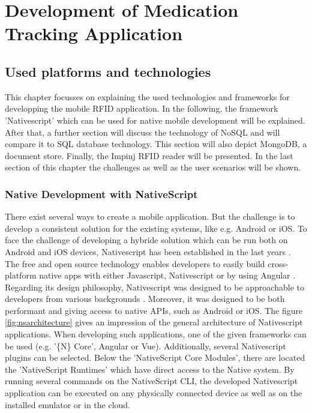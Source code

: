 \chapter{Development of Medication Tracking Application}
\label{Kap3}

\section{Used platforms and technologies} \label{platforms}

This chapter focusses on explaining the used technologies and frameworks for developping the mobile RFID application. In the following, the framework 'Nativescript' which can be used for native mobile development will be explained. After that, a further section will discuss the technology of NoSQL and will compare it to SQL database technology. This section will also depict MongoDB, a document store. Finally, the Impinj RFID reader will be presented. In the last section \pageref{app_development} of this chapter the challenges as well as the user scenarios will be shown. 

\subsection{Native Development with NativeScript} 

There exist several ways to create a mobile application. But the challenge is to develop a consistent solution for the existing systems, like e.g. Android or iOS.
To face the challenge of developing a hybride solution which can be run both on Android and iOS devices, Nativescript has been established in the last years \cite{nativescript}. The free and open source technology enables developers to easily build cross-platform native apps with either Javascript, Nativescript or by using Angular \cite{nativescript}. 
Regarding its design philosophy, Nativescript was designed to be approachable to developers from various backgrounds \cite{nativescript}. Moreover, it was designed to be both performant and giving access to native APIs, such as Android or iOS.
The figure \ref{fig:nsarchitecture} gives an impression of the general architecture of Nativescript applications. When developing such applications, one of the given frameworks can be used (e.g. '\{N\} Core', Angular or Vue). Additionally, several Nativescript plugins can be selected. Below the 'NativeScript Core Modules', there are located the 'NativeScript Runtimes' which have direct access to the Native system. By running several commands on the NativeScript \ac{CLI}, the developed Nativescript application can be executed on any physically connected device as well as on the installed emulator or in the cloud. 

